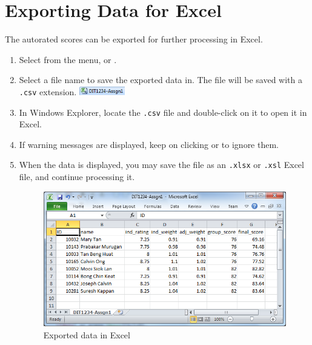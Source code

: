 \documentclass[a4paper,11pt]{refart}
\begin{document}
\section{Exporting Data for Excel}
The autorated scores can be exported for further processing in Excel.
\begin{enumerate}
\item Select  from the menu, or .
\item Select a file name to save the exported data in. The file will be saved with a \texttt{.csv} extension. \includegraphics[height=1em]{csv.png}
\item In Windows Explorer, locate the \texttt{.csv} file and double-click on it to open it in Excel.
\item If warning messages are displayed, keep on clicking  or  to ignore them.
\item When the data is displayed, you may save the file as an \texttt{.xlsx} or \texttt{.xsl} Excel file, and continue processing it.

\begin{figure}[hbt!]
\includegraphics[width=\textwidth]{excel.png}
\caption{Exported data in Excel}
\end{figure}

\end{enumerate}



\end{document}
